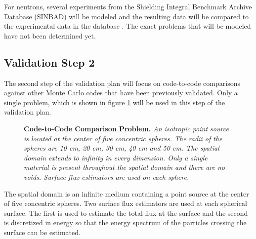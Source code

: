 For neutrons, several experiments from the Shielding Integral Benchmark 
Archive Database (SINBAD) will be modeled and the resulting data will be 
compared to the experimental data in the database \citep{kodeli_sinbad_2006}.
The exact problems that will be modeled have not been determined yet.

\subsection{Validation Step 2}
The second step of the validation plan will focus on code-to-code comparisons
against other Monte Carlo codes that have been previously validated. Only a
single problem, which is shown in figure \ref{fig:code_comparison_problem} will 
be used in this step of the validation plan. 
\begin{figure}[t!]
  \begin{center}
  \end{center}
  \caption{\textbf{Code-to-Code Comparison Problem.}
    \textit{An isotropic point source is located at the center of five 
      concentric spheres. The radii of the spheres are 10 cm, 20 cm, 30 cm, 40
      cm and 50 cm. The spatial domain extends to infinity in every dimension.
      Only a single material is present throughout the spatial domain and there
      are no voids. Surface flux estimators are used on each sphere.}}
  \label{fig:code_comparison_problem}
\end{figure}
The spatial domain is an infinite medium containing a point source at the 
center of five concentric spheres. Two surface flux estimators are used at each
spherical surface. The first is used to estimate the total flux
at the surface and the second is discretized in energy so that the energy
spectrum of the particles crossing the surface can be estimated.

